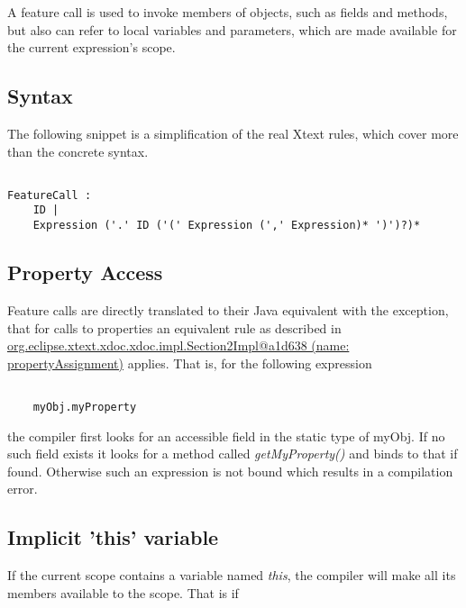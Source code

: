 \documentclass[a4paper,10pt]{scrreprt}
\begin{document}
A feature call is used to invoke members of objects, such as fields and methods, but also can refer to local variables and parameters, which are made available for the current expression's scope.

\subsection{ Syntax }

The following snippet is a simplification of the real Xtext rules, which cover more than the concrete syntax.

\begin{lstlisting}

FeatureCall :
	ID |
	Expression ('.' ID ('(' Expression (',' Expression)* ')')?)*

\end{lstlisting}





\subsection{ Property Access }
\label{PropertyAccess}

Feature calls are directly translated to their Java equivalent with the exception, that for calls to properties an equivalent rule as described in 
\hyperref[propertyAssignment]{org.eclipse.xtext.xdoc.xdoc.impl.Section2Impl@a1d638 (name: propertyAssignment)} applies. 
That is, for the following expression


\begin{lstlisting}

	myObj.myProperty

\end{lstlisting}


the compiler first looks for an accessible field in the static type of myObj. If no such field exists it looks for a method called \emph{getMyProperty()} and binds to that if found.
Otherwise such an expression is not bound which results in a compilation error.




\subsection{ Implicit 'this' variable }
\label{ImplicitThis}

If the current scope contains a variable named \emph{this}, the compiler will make all its members available to the scope. 
That is if 
\end{document}
